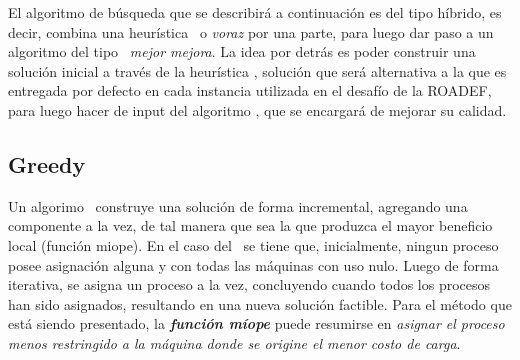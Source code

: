 \documentclass[../informe2.tex]{subfiles}
\begin{document}
El algoritmo de búsqueda que se describirá a continuación es del tipo híbrido, es decir, combina una heurística \greedy\ o \textit{voraz} por una parte, para luego dar paso a un algoritmo del tipo \hillc\ \textit{mejor mejora}. La idea por detrás es poder construir una solución inicial a través de la heurística \greedy, solución que será alternativa a la que es entregada por defecto en cada instancia utilizada en el desafío de la ROADEF, para luego hacer de input del algoritmo \hillc, que se encargará de mejorar su calidad.
\subsection{Greedy}
Un algorimo \greedy\ construye una solución de forma incremental, agregando una componente a la vez, de tal manera que sea la que produzca el mayor beneficio local (función miope). En el caso del \mrp\ se tiene que, inicialmente, ningun proceso posee asignación alguna y con todas las máquinas con uso nulo. Luego de forma iterativa, se asigna un proceso a la vez, concluyendo cuando todos los procesos han sido asignados, resultando en una nueva solución factible. Para el método que está siendo presentado, la \textbf{\textit{función míope}} puede resumirse en \textit{asignar el proceso menos restringido a la máquina donde se origine el menor costo de carga}. \\
\end{document}
